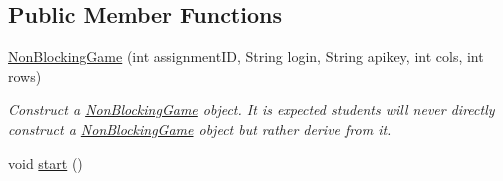 \subsection*{Public Member Functions}
\begin{DoxyCompactItemize}
\item 
\mbox{\hyperlink{classbridges_1_1games_1_1_non_blocking_game_ae85ea8dcc355372ba354f4e26323fb76}{Non\+Blocking\+Game}} (int assignment\+ID, String login, String apikey, int cols, int rows)
\begin{DoxyCompactList}\small\item\em Construct a \mbox{\hyperlink{classbridges_1_1games_1_1_non_blocking_game}{Non\+Blocking\+Game}} object. It is expected students will never directly construct a \mbox{\hyperlink{classbridges_1_1games_1_1_non_blocking_game}{Non\+Blocking\+Game}} object but rather derive from it. \end{DoxyCompactList}\item 
void \mbox{\hyperlink{classbridges_1_1games_1_1_non_blocking_game_ac4df60691641278f139d138c7347674a}{start}} ()
\end{DoxyCompactItemize}
